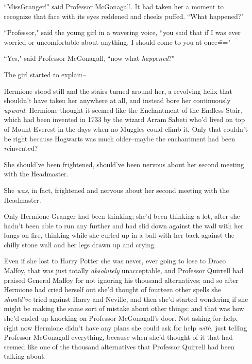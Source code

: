 ``Miss\?Granger!" said Professor McGonagall. It had taken her a moment to recognize that face with its eyes reddened and cheeks puffed. ``What happened?"

``Professor," said the young girl in a wavering voice, ``you said that if I was ever worried or uncomfortable about anything, I should come to you at once\==="

``Yes," said Professor McGonagall, ``now what \emph{happened}?"

The girl started to explain\---

\later

Hermione stood still and the stairs turned around her, a revolving helix that shouldn't have taken her anywhere at all, and instead bore her continuously \emph{upward}. Hermione thought it seemed like the Enchantment of the Endless Stair, which had been invented in 1733 by the wizard Arram Sabeti who'd lived on top of Mount Everest in the days when no Muggles could climb it. Only that couldn't be right because Hogwarts was much older\---maybe the enchantment had been \emph{re}invented?

She should've been frightened, should've been nervous about her second meeting with the Headmaster.

She \emph{was}, in fact, frightened and nervous about her second meeting with the Headmaster.

Only Hermione Granger had been thinking; she'd been thinking a lot, after she hadn't been able to run any further and had slid down against the wall with her lungs on fire, thinking while she curled up in a ball with her back against the chilly stone wall and her legs drawn up and crying.

Even if she lost to Harry Potter she was never, ever going to lose to Draco Malfoy, that was just totally \emph{absolutely} unacceptable, and Professor Quirrell had praised General Malfoy for not ignoring his thousand alternatives; and so after Hermione had cried herself out she'd thought of fourteen other spells she \emph{should've} tried against Harry and Neville, and then she'd started wondering if she might be making the same sort of mistake about other things; and that was how she'd ended up knocking on Professor McGonagall's door. Not asking for help, right now Hermione didn't have any plans she could ask for help \emph{with}, just telling Professor McGonagall everything, because when she'd thought of it that had seemed like one of the thousand alternatives that Professor Quirrell had been talking about.

